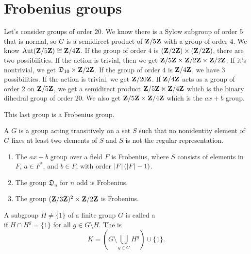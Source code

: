 \documentclass[11pt, twoside]{amsart}
\begin{document}
\section{Frobenius groups}
Let's consider groups of order $20$. We know there is a Sylow subgroup of order $5$ that is normal, so $G$ is a semidirect product of $\mathbf{Z}/5\mathbf{Z}$ with a group of order $4$. We know $\operatorname{Aut}(\mathbf{Z}/5\mathbf{Z}) \cong \mathbf{Z}/4\mathbf{Z}$. If the group of order $4$ is $(\mathbf{Z}/2\mathbf{Z} )\times(\mathbf{Z}/2\mathbf{Z} )$, there are two possibilities. If the action is trivial, then we get $\mathbf{Z}/5\mathbf{Z} \times \mathbf{Z}/2\mathbf{Z} \times \mathbf{Z}/2\mathbf{Z}$. If it's nontrivial, we get $\mathfrak{D}_{10}\times\mathbf{Z}/2\mathbf{Z} $. If the group of order $4$ is $\mathbf{Z}/4\mathbf{Z} $, we have $3$ possibilities. If the action is trivial, we get $\mathbf{Z}/{20}\mathbf{Z}$. If $\mathbf{Z}/4\mathbf{Z}$ acts as a group of order $2$ on $\mathbf{Z}/5\mathbf{Z} $, we get a semidirect product $\mathbf{Z}/5\mathbf{Z}\ltimes \mathbf{Z}/4\mathbf{Z}$ which is the binary dihedral group of order $20$. We also get $\mathbf{Z}/5\mathbf{Z}\ltimes \mathbf{Z}/4\mathbf{Z}$ which is the $ax+b$ group.

This last group is a Frobenius group.
\begin{definition}
A  $G$ is a group acting transitively on a set $S$ such that no nonidentity element of $G$ fixes at least two elements of $S$ and $S$ is not the regular representation.
\end{definition}

\begin{example}\text{}
\begin{enumerate}
\item The $ax+b$ group over a field $F$ is Frobenius, where $S$ consists of elements in $F$, $a\in F^*$, and $b\in F$, with order $\left \lvert F \right \rvert (\left \lvert F \right \rvert - 1)$.
\item The group $\mathfrak{D}_n$ for $n$ odd is Frobenius.
\item The group $(\mathbf{Z}/3\mathbf{Z})^2 \ltimes \mathbf{Z}/2\mathbf{Z}$ is Frobenius.
\end{enumerate}
\end{example}

\begin{definition}
A subgroup $H\ne \{1\}$ of a finite group $G$ is called a   \\ if $H\cap H^g = \{1\}$ for all $g\in G\setminus H$. The  is
$$
K = \left(G \setminus \bigcup_{g\in G} H^g \right)\cup \{1\}.
$$
\end{definition}
\end{document}
